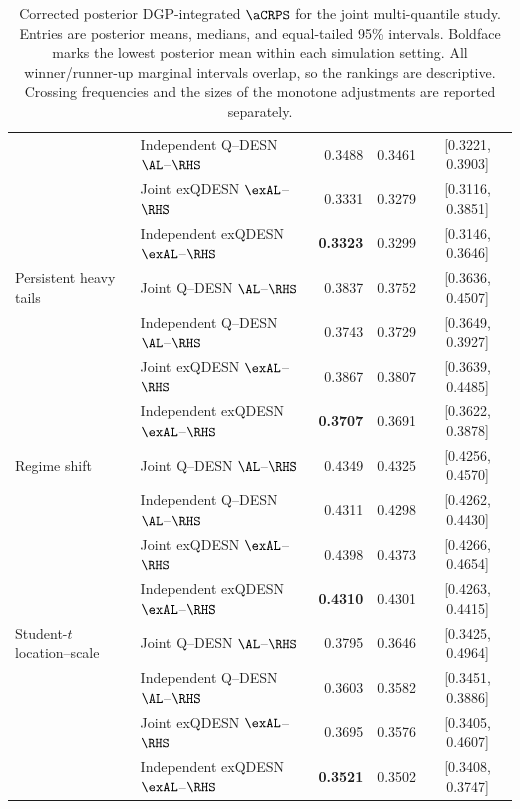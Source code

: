 \begin{table}[p]
{\begin{tabular}{@{}>{\raggedright\arraybackslash}p{}>{\raggedright\arraybackslash}p{}rrc@{}}
 & Independent Q--DESN \(\AL\)--\(\RHS\) & 0.3488 & 0.3461 & [0.3221, 0.3903] \\
 & Joint exQDESN \(\exAL\)--\(\RHS\) & 0.3331 & 0.3279 & [0.3116, 0.3851] \\
 & Independent exQDESN \(\exAL\)--\(\RHS\) & \textbf{0.3323} & 0.3299 & [0.3146, 0.3646] \\
\addlinespace[2pt]
Persistent heavy tails & Joint Q--DESN \(\AL\)--\(\RHS\) & 0.3837 & 0.3752 & [0.3636, 0.4507] \\
 & Independent Q--DESN \(\AL\)--\(\RHS\) & 0.3743 & 0.3729 & [0.3649, 0.3927] \\
 & Joint exQDESN \(\exAL\)--\(\RHS\) & 0.3867 & 0.3807 & [0.3639, 0.4485] \\
 & Independent exQDESN \(\exAL\)--\(\RHS\) & \textbf{0.3707} & 0.3691 & [0.3622, 0.3878] \\
\addlinespace[2pt]
Regime shift & Joint Q--DESN \(\AL\)--\(\RHS\) & 0.4349 & 0.4325 & [0.4256, 0.4570] \\
 & Independent Q--DESN \(\AL\)--\(\RHS\) & 0.4311 & 0.4298 & [0.4262, 0.4430] \\
 & Joint exQDESN \(\exAL\)--\(\RHS\) & 0.4398 & 0.4373 & [0.4266, 0.4654] \\
 & Independent exQDESN \(\exAL\)--\(\RHS\) & \textbf{0.4310} & 0.4301 & [0.4263, 0.4415] \\
\addlinespace[2pt]
Student-\(t\) location--scale & Joint Q--DESN \(\AL\)--\(\RHS\) & 0.3795 & 0.3646 & [0.3425, 0.4964] \\
 & Independent Q--DESN \(\AL\)--\(\RHS\) & 0.3603 & 0.3582 & [0.3451, 0.3886] \\
 & Joint exQDESN \(\exAL\)--\(\RHS\) & 0.3695 & 0.3576 & [0.3405, 0.4607] \\
 & Independent exQDESN \(\exAL\)--\(\RHS\) & \textbf{0.3521} & 0.3502 & [0.3408, 0.3747] \\
\bottomrule
\end{tabular}
}%
\caption{Corrected posterior DGP-integrated \(\aCRPS\) for the joint multi-quantile study. Entries are posterior means, medians, and equal-tailed 95\% intervals. Boldface marks the lowest posterior mean within each simulation setting. All winner/runner-up marginal intervals overlap, so the rankings are descriptive. Crossing frequencies and the sizes of the monotone adjustments are reported separately.}
\label{tab:joint-qdesn-corrected-v4-score}
\end{table}
